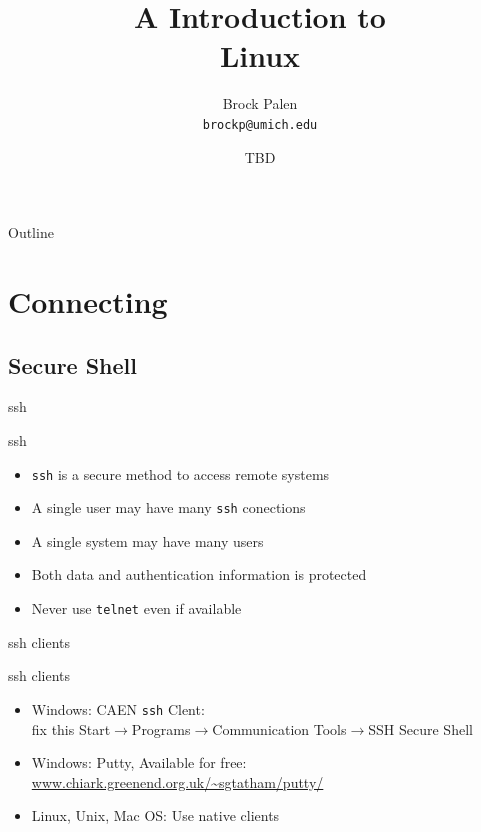 \documentclass{beamer}
\title[CAC Intro] {A Introduction to\\ Linux }
\author{Brock Palen\\ \texttt{brockp@umich.edu}}
\date{TBD}
\begin{document}
  \begin{frame}
    \titlepage
  \end{frame}

  \begin{frame}{Outline}
    \tableofcontents
  \end{frame}
  
  \section{Connecting}
  \subsection {Secure Shell}

  \begin{frame}{ssh}
    \begin{block}{ssh}
    \begin{itemize}
    \item \texttt{ssh} is a secure method to access remote systems
    \item A single user may have many \texttt{ssh} conections
    \item A single system may have many users
    \item Both data and authentication information is protected
    \item<2-|alert@1->Never use \texttt{telnet} even if available
    \end{itemize}
    \end{block}
  \end{frame}
  \begin{frame}{ssh clients}
    \begin{block}{ssh clients}
    \begin{itemize}
    \item <1->Windows: CAEN \texttt{ssh} Clent: \\
\alert{fix this}
        Start$\rightarrow$Programs$\rightarrow$Communication Tools$\rightarrow$SSH Secure Shell
    \item <2->Windows: Putty, Available for free: \\
        \url{www.chiark.greenend.org.uk/~sgtatham/putty/}
    \item <3->Linux, Unix, Mac OS: Use native clients
    \end{itemize}
   \end{block}
  \end{frame}
\end{document}
